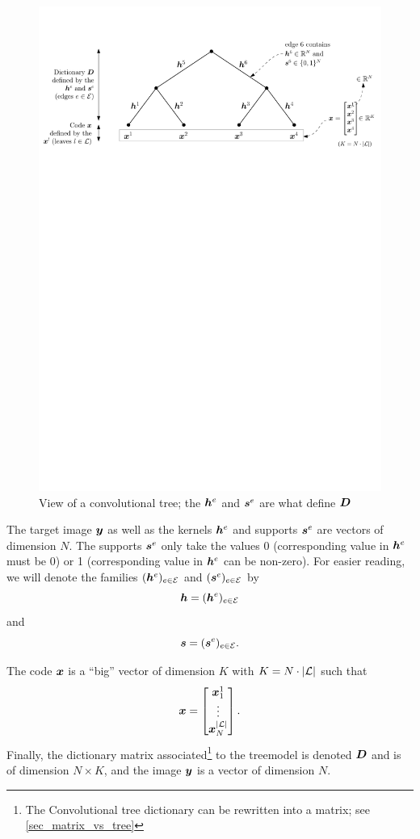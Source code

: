 \begin{figure}[!ht]\centering
\includegraphics[width=\textwidth]{figures/tree.pdf}
\caption{View of a convolutional tree; the $\bm{h}^e$ and $\bm{s}^e$ are what define $\bm{D}$}\label{fig_tree}
\end{figure}

The target image $\bm{y}$ as well as the kernels $\bm{h}^e$ and supports $\bm{s}^e$ are vectors of dimension $N$. The supports $\bm{s}^e$ only take the values 0 (corresponding value in $\bm{h}^e$ must be 0) or 1 (corresponding value in $\bm{h}^e$ can be non-zero). For easier reading, we will denote the families $(\bm{h}^e)_{e \in \mathcal E}$ and $(\bm{s}^e)_{e \in \mathcal E}$ by $$\bm{h} = (\bm{h}^e)_{e \in \mathcal E}$$ and $$\bm{s} = (\bm{s}^e)_{e \in \mathcal E}.$$

The code $\bm{x}$ is a “big” vector of dimension $K$ with $K = N \cdot |\mathcal L|$ such that $$\bm{x} = \begin{bmatrix}\bm{x}^1_1 \\ \vdots \\ \bm{x}^{|\mathcal L|}_N\end{bmatrix}.$$ 
Finally, the dictionary matrix associated\footnote{The Convolutional tree dictionary can be rewritten into a matrix; see \cref{sec_matrix_vs_tree}} to the \gls{treemodel} is denoted $\bm{D}$ and is of dimension $N \times K$, and the image $\bm{y}$ is a vector of dimension $N$.

